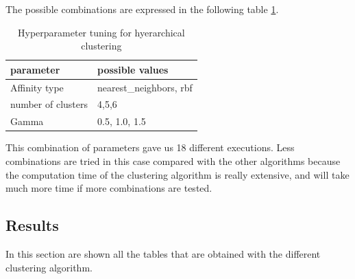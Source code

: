 \documentclass[12pt]{article}
\begin{document}
The possible combinations are expressed in the following table \ref{table:hyp-spectral}. \\

\begin{table}[H]
\centering
\begin{tabular}{ll}
\multicolumn{1}{l|}{parameter}          & possible values         \\ \hline
\multicolumn{1}{l|}{Affinity type}      & nearest\_neighbors, rbf \\
\multicolumn{1}{l|}{number of clusters} & 4,5,6                   \\
Gamma                                   & 0.5, 1.0, 1.5          
\end{tabular}
\caption{Hyperparameter tuning for hyerarchical clustering}
\label{table:hyp-spectral}
\end{table}

This combination of parameters gave us 18 different executions. Less combinations are tried in this case compared with the other algorithms because the computation time of the clustering algorithm is really extensive, and will take much more time if more combinations are tested.

\subsection{Results}

In this section are shown all the tables that are obtained with the different clustering algorithm.
\end{document}
